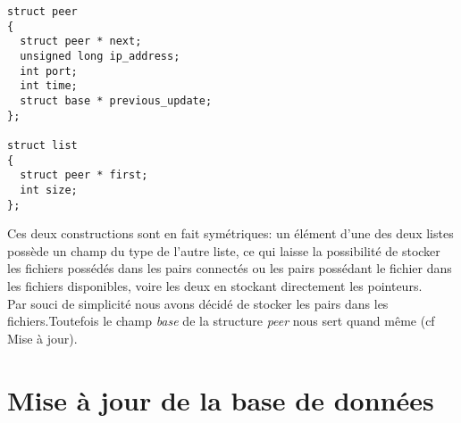 \begin{verbatim}
struct peer
{
  struct peer * next;
  unsigned long ip_address;
  int port;
  int time;
  struct base * previous_update;
};

struct list
{
  struct peer * first;
  int size;
};
\end{verbatim}

Ces deux constructions sont en fait symétriques: un élément d'une des deux listes possède un champ du type de l'autre liste, ce qui laisse la possibilité de stocker les fichiers possédés dans les pairs connectés ou les pairs possédant le fichier dans les fichiers disponibles, voire les deux en stockant directement les pointeurs.\\ 
Par souci de simplicité nous avons décidé de stocker les pairs dans les fichiers.Toutefois le champ \textit{base} de la structure \textit{peer} nous sert quand même (cf Mise à jour).

\section{Mise à jour de la base de données}

